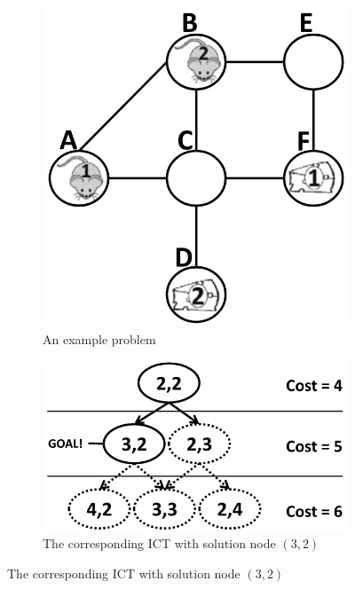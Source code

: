 \documentclass[english]{article}
\begin{document}
	
	\begin{figure}[b]
		\centering
		\begin{subfigure}{0.2\textwidth}
			\centering
			\includegraphics[width=\linewidth]{img/mdds1}
			\caption{An example problem}
			\label{fig:problem}
		\end{subfigure}
		\hfill
		\begin{subfigure}{0.3\textwidth}
			\centering
			\includegraphics[width=\linewidth]{img/ict2}
			\caption{The corresponding ICT with solution node $(3,2)$}
			\label{fig:ict2}
		\end{subfigure}
		\hfill

\end{figure}
\end{document}
